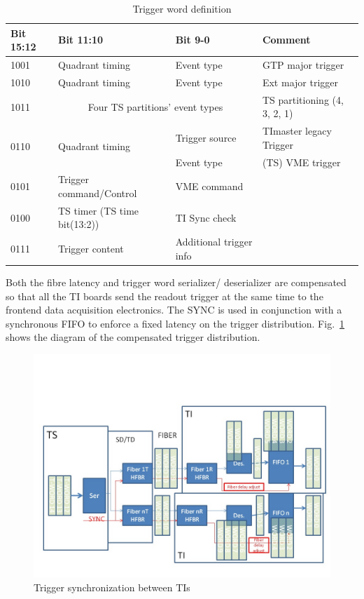 \begin{table}
\begin{adjustbox}{width=\columnwidth,center}
	\begin{tabular}{| l | l | l | l |}
		\hline \hline
		Bit 15:12		& 	Bit 11:10 &	Bit 9-0	 & Comment		\\
		\hline
	1001	& Quadrant timing	& Event type	 & GTP major trigger \\
	1010	& Quadrant timing	& Event type	 & Ext major trigger \\
	
	1011	& \multicolumn{2}{c}{Four TS partitions’ event types}    & TS partitioning (4, 3, 2, 1) \\

	\multirow{2}{*}{0110}	& \multirow{2}{*}{Quadrant timing}	& Trigger source & TImaster legacy Trigger \\
		    &                   & Event type	 & (TS) VME trigger     \\
	0101	& Trigger command/Control	& VME command \\
	0100	& TS timer (TS time bit(13:2))	& TI Sync check \\
	0111	& Trigger content	& Additional trigger info \\
		\hline \hline
	\end{tabular}
\end{adjustbox}
\caption{Trigger word definition}
\label{tab:trigger_word_definition}
\end{table}

Both the fibre latency and trigger word serializer/ deserializer are compensated so that all the TI boards send the readout trigger at the same time to the frontend data acquisition electronics.  The SYNC is used in conjunction with a synchronous FIFO to enforce a fixed latency on the trigger distribution. Fig.~\ref{fig:TIsync} shows the diagram of the compensated trigger distribution.

\begin{figure}[hbt]
	\centering
	\includegraphics[width=1.0\columnwidth,keepaspectratio]{img/TrgSync.jpg}
	\caption{Trigger synchronization between TIs}
	\label{fig:TIsync}
\end{figure}

